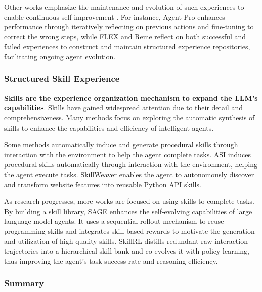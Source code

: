 Other works emphasize the maintenance and evolution of such experiences to enable continuous self-improvement \cite{Agent-Pro, FLEX, Training-Free_GRPO}. For instance, Agent-Pro \cite{Agent-Pro} enhances performance through iteratively reflecting on previous actions and fine-tuning to correct the wrong steps, while FLEX \cite{FLEX} and Reme \cite{Reme} reflect on both successful and failed experiences to construct and maintain structured experience repositories, facilitating ongoing agent evolution.

\subsubsection{Structured Skill Experience}
\label{sec:structure_skill_experience}
\textbf{Skills are the experience organization mechanism to expand the LLM's capabilities}. Skills have gained widespread attention due to their detail and comprehensiveness. Many methods focus on exploring the automatic synthesis of skills to enhance the capabilities and efficiency of intelligent agents.

Some methods automatically induce and generate procedural skills through interaction with the environment to help the agent complete tasks. ASI \cite{ASI} induces procedural skills automatically through interaction with the environment, helping the agent execute tasks. SkillWeaver \cite{SkillWeaver} enables the agent to autonomously discover and transform website features into reusable Python API skills. 

As research progresses, more works are focused on using skills to complete tasks. By building a skill library, SAGE \cite{SAGE} enhances the self-evolving capabilities of large language model agents. It uses a sequential rollout mechanism to reuse programming skills and integrates skill-based rewards to motivate the generation and utilization of high-quality skills. SkillRL \cite{SkillRL_2} distills redundant raw interaction trajectories into a hierarchical skill bank and co-evolves it with policy learning, thus improving the agent's task success rate and reasoning efficiency.


\subsubsection{Summary}

